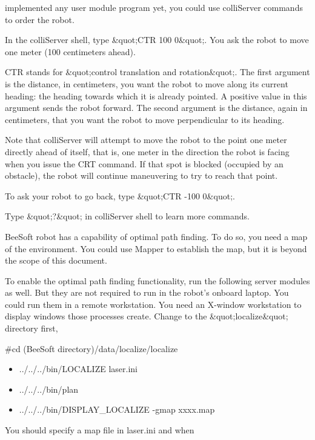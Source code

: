implemented any user module program yet, you could use colliServer
commands to order the robot.\par \par In the colliServer shell, type
\&quot;CTR 100 0\&quot;. You ask the robot to move one meter (100
centimeters ahead).\par \par CTR stands for \&quot;control translation
and rotation\&quot;. The first argument is the distance, in
centimeters, you want the robot to move along its current heading: the
heading towards which it is already pointed. A positive value in this
argument sends the robot forward. The second argument is the distance,
again in centimeters, that you want the robot to move perpendicular to
its heading.\par \par Note that colliServer will attempt to move the
robot to the point one meter directly ahead of itself, that is, one
meter in the direction the robot is facing when you issue the CRT
command. If that spot is blocked (occupied by an obstacle), the robot
will continue maneuvering to try to reach that point.\par \par To ask
your robot to go back, type \&quot;CTR -100 0\&quot;. \par \par Type
\&quot;?\&quot; in colliServer shell to learn more commands.\par \par
BeeSoft robot has a capability of optimal path finding. To do so, you
need a map of the environment. You could use Mapper to establish the
map, but it is beyond the scope of this document.\par \par To enable
the optimal path finding functionality, run the following server
modules as well. But they are not required to run in the robot's
onboard laptop. You could run them in a remote workstation. You need
an X-window workstation to display windows those processes create.
Change to the \&quot;localize\&quot; directory first,\par \par \#cd
(BeeSoft directory)/data/localize/localize\par \begin{itemize}\item
  ../../../bin/LOCALIZE laser.ini  \item ../../../bin/plan 
\item ../../../bin/DISPLAY\_LOCALIZE -gmap xxxx.map 
\end{itemize}\par You should specify a map file in laser.ini and when
